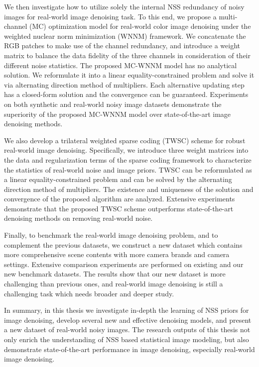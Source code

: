 \documentclass[12pt,oneside]{report}
\numberwithin{figure}{chapter}
\newenvironment{preliminary}%
{\pagestyle{plain}\pagenumbering{roman}}%
{\pagenumbering{arabic}}
\begin{document}
\begin{preliminary}
We then investigate how to utilize solely the internal NSS redundancy of noisy images for real-world image denoising task. To this end, we propose a multi-channel (MC) optimization model for real-world color image denoising under the weighted nuclear norm minimization (WNNM) framework. We concatenate the RGB patches to make use of the channel redundancy, and introduce a weight matrix to balance the data fidelity of the three channels in consideration of their different noise statistics. The proposed MC-WNNM model has no analytical solution. We reformulate it into a linear equality-constrained problem and solve it via alternating direction method of multipliers. Each alternative updating step has a closed-form solution and the convergence can be guaranteed. Experiments on both synthetic and real-world noisy image datasets demonstrate the superiority of the proposed MC-WNNM model over state-of-the-art image denoising methods.

We also develop a trilateral weighted sparse coding (TWSC) scheme for robust real-world image denoising. Specifically, we introduce three weight matrices into the data and regularization terms of the sparse coding framework to characterize the statistics of real-world noise and image priors. TWSC can be reformulated as a linear equality-constrained problem and can be solved by the alternating direction method of multipliers. The existence and uniqueness of the solution and convergence of the proposed algorithm are analyzed. Extensive experiments demonstrate that the proposed TWSC scheme outperforms state-of-the-art denoising methods on removing real-world noise.

Finally, to benchmark the real-world image denoising problem, and to complement the previous datasets, we construct a new dataset which contains more comprehensive scene contents with more camera brands and camera settings. Extensive comparison experiments are performed on existing and our new benchmark datasets. The results show that our new dataset is more challenging than previous ones, and real-world image denoising is still a challenging task which needs broader and deeper study.

In summary, in this thesis we investigate in-depth the learning of NSS priors for image denoising, develop several new and effective denoising models, and present a new dataset of real-world noisy images. The research outputs of this thesis not only enrich the understanding of NSS based statistical image modeling, but also demonstrate state-of-the-art performance in image denoising, especially real-world image denoising.



\end{preliminary}
\end{document}
